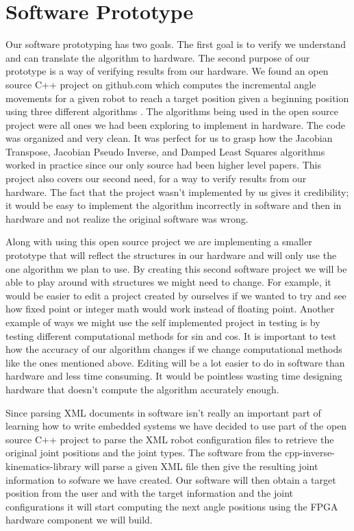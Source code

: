 \section{Software Prototype}
Our software prototyping has two goals. The first goal is to verify we 
understand and can translate the algorithm to hardware. The second 
purpose of our prototype is a way of verifying results from our hardware.
We found an open source C++ project on github.com which computes the 
incremental angle movements for a given robot to reach a target position 
given a beginning position using three different algorithms 
\cite{ik_cpp_library}. The algorithms being used in the open source project 
were all ones we had been exploring to implement in hardware. The code was 
organized and very clean. It was perfect for us to grasp how the Jacobian 
Transpose, Jacobian Pseudo Inverse, and Damped Least Squares algorithms 
worked in practice since our only source had been higher level papers. This 
project also covers our second need, for a way to verify results from our 
hardware. The fact that the project wasn't implemented by us gives it 
credibility; it would be easy to implement the algorithm incorrectly in 
software and then in hardware and not realize the original software was 
wrong. 

Along with using this open source project we are implementing a smaller 
prototype that will reflect the structures in our hardware and will only 
use the one algorithm we plan to use. By creating this second software 
project we will be able to play around with structures we might need to 
change. For example, it would be easier to edit a project created by 
ourselves if we wanted to try and see how fixed point or integer math 
would work instead of floating point. Another example of ways we might use 
the self implemented project in testing is by testing different 
computational methods for sin and cos. It is important to test how the 
accuracy of our algorithm changes if we change computational methods like 
the ones mentioned above. Editing will be a lot easier to do in software 
than hardware and less time consuming. It would be pointless wasting time 
designing hardware that doesn't compute the algorithm accurately enough. 

Since parsing XML documents in software isn't really an important part of 
learning how to write embedded systems we have decided to use part of the 
open source C++ project to parse the XML robot configuration files to 
retrieve the original joint positions and the joint types. The software 
from the cpp-inverse-kinematics-library will parse a given XML file then 
give the resulting joint information to sofware we have created. Our 
software will then obtain a target position from the user and with the 
target information and the joint configurations it will start computing the 
next angle positions using the FPGA hardware component we will build. 
